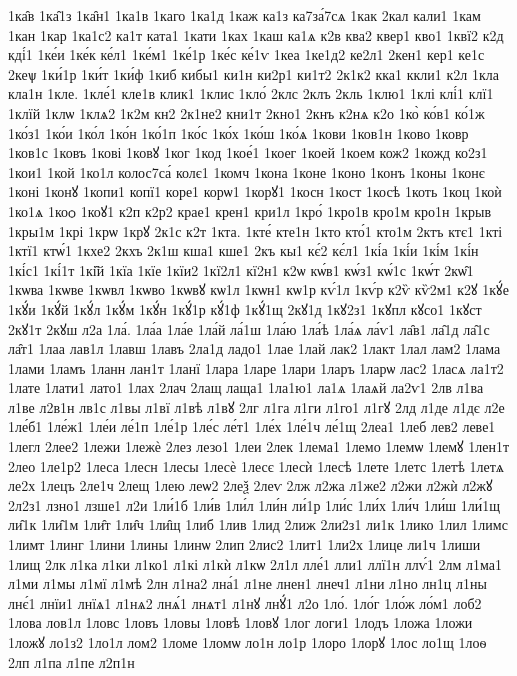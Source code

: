 {1ка̑в
1ка̑1з
1ка̑н1
1ка1в
1каго
1ка1д
1каж
ка1з
ка7за́7сѧ
1как
2кал
кали1
1кам
1кан
1кар
1ка1с2
ка1т
ката1
1кати
1ках
1каш
ка1ѧ
к2в
ква2
квер1
кво1
1квї2
к2д
кді́1
1ке́и
1ке́к
ке́л1
1ке́м1
1ке́1р
1ке́с
ке́1ѵ
1кеа
1ке1д2
ке2л1
2кен1
кер1
ке1с
2кеѱ
1ки́1р
1ки́т
1ки́ф
1киб
кибы1
ки1н
ки2р1
ки1т2
2к1к2
кка1
ккли1
к2л
1кла
кла1н
1кле.
1кле́1
кле1в
клик1
1клис
1кло́
2клс
2клъ
2кль
1клю1
1клі
клі́1
клї1
1клїй
1клѡ
1клѧ2
1к2м
кн2
2к1не2
кни1т
2кно1
2кнъ
к2нѧ
к2о
1ко̀
ко́в1
ко́1ж
1ко́з1
1ко́и
1ко́л
1ко́н
1ко́1п
1ко́с
1ко́х
1ко́ш
1ко́ѧ
1кови
1ков1н
1ково
1ковр
1ков1с
1ковъ
1кові
1ковꙋ
1ког
1код
1кое́1
1коег
1коей
1коем
кож2
1кожд
ко2з1
1кои1
1кой
1ко1л
колос7са́
колє1
1комч
1кона
1коне
1коно
1конъ
1коны
1конє
1коні
1конꙋ
1копи1
копї1
коре1
корѡ1
1корꙋ1
1косн
1кост
1косѣ
1коть
1коц
1коѝ
1ко1ѧ
1коѻ
1коꙋ1
к2п
к2р2
крае1
крен1
кри1л
1кро́
1кро1в
кро1м
кро1н
1крыв
1кры1м
1крі
1крѡ
1крꙋ
2к1с
к2т
1кта.
1кте́
кте1н
1кто
кто́1
кто1м
2ктъ
ктє1
1кті
1ктї1
ктѡ́1
1кхе2
2кхъ
2к1ш
кша1
кше1
2къ
кы1
кє́2
кє́л1
1кі́а
1кі́и
1кі́м
1кі́н
1кі́с1
1кі́1т
1кі̑й
1кїа
1кїе
1кїи2
1кї2л1
кї2н1
к2ѡ
кѡ́в1
кѡ́з1
кѡ́1с
1кѡ́т
2кѡ̑1
1кѡва
1кѡве
1кѡвл
1кѡво
1кѡвꙋ
кѡ1л
1кѡн1
кѡ1р
кѵ́1л
1кѵ́р
к2ѷ
кѷ2м1
к2ꙋ
1кꙋ́е
1кꙋ́и
1кꙋ́й
1кꙋ́л
1кꙋ́м
1кꙋ́н
1кꙋ́1р
кꙋ́1ф
1кꙋ́1щ
2кꙋ1д
1кꙋ2з1
1кꙋпл
кꙋсо1
1кꙋст
2кꙋ1т
2кꙋш
л2а
1ла́.
1ла́а
1ла́е
1ла́й
ла́1ш
1ла́ю
1ла́ѣ
1ла́ѧ
ла́ѵ1
ла̑в1
ла̑1д
ла̑1с
ла̑т1
1лаа
лав1л
1лавш
1лавъ
2ла1д
ладо1
1лае
1лай
лак2
1лакт
1лал
лам2
1лама
1лами
1ламъ
1ланн
лан1т
1ланї
1лара
1ларе
1лари
1ларъ
1ларѡ
лас2
1ласѧ
ла1т2
1лате
1лати1
лато1
1лах
2лач
2лащ
лаща1
1ла1ю1
ла1ѧ
1лаѧй
ла2ѵ1
2лв
л1ва
л1ве
л2в1н
лв1с
л1вы
л1вї
л1вѣ
л1вꙋ
2лг
л1га
л1ги
л1го1
л1гꙋ
2лд
л1де
л1дє
л2е
1ле́б1
1ле́ж1
1ле́и
ле́1п
1ле́1р
1ле́с
ле́т1
1ле́х
1ле́1ч
ле́1щ
2леа1
1леб
лев2
леве1
1легл
2лее2
1лежи
1лежѐ
2лез
лезо1
1леи
2лек
1лема1
1лемо
1лемѡ
1лемꙋ
1лен1т
2лео
1ле1р2
1леса
1лесн
1лесы
1лесѐ
1лесє
1лесѝ
1лесѣ
1лете
1летс
1летѣ
1летѧ
ле2х
1лецъ
2ле1ч
2лещ
1лею
леѡ2
2леѯ
2леѵ
2лж
л2жа
л1же2
л2жи
л2жѝ
л2жꙋ
2л2з1
лзно1
лзше1
л2и
1ли́1б
1ли́в
1ли́л
1ли́н
ли́1р
1ли́с
1ли́х
1ли́ч
1ли́ш
1ли́1щ
ли̑1к
1ли̑1м
1ли̑т
1ли̑ч
1ли̑щ
1либ
1лив
1лид
2лиж
2ли2з1
ли1к
1лико
1лил
1лимс
1лимт
1линг
1лини
1лины
1линѡ
2лип
2лис2
1лит1
1ли2х
1лице
ли1ч
1лиши
1лищ
2лк
л1ка
л1ки
л1ко1
л1кі
л1кѝ
л1кѡ
2л1л
лле́1
лли1
ллї1н
ллѵ́1
2лм
л1ма1
л1ми
л1мы
л1мї
л1мѣ
2лн
л1на2
лна́1
л1не
лнен1
лнеч1
л1ни
л1но
лн1ц
л1ны
лнє́1
лнїи1
лнїѧ1
л1нѧ2
лнѧ́1
лнѧт1
л1нꙋ
лнꙋ́1
л2о
1ло́.
1ло́г
1ло́ж
ло́м1
лоб2
1лова
лов1л
1ловс
1ловъ
1ловы
1ловѣ
1ловꙋ
1лог
логи1
1лодъ
1ложа
1ложи
1ложꙋ
ло1з2
1ло1л
лом2
1ломе
1ломѡ
ло1н
ло1р
1лоро
1лорꙋ
1лос
ло1щ
1лоѳ
2лп
л1па
л1пе
л2п1н
}
